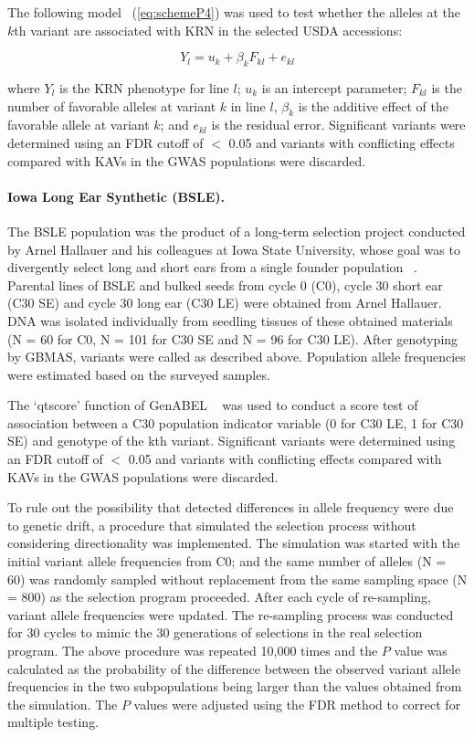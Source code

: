 \documentclass[10pt,letterpaper]{article}
\begin{document}
The following model ~(\ref{eq:schemeP4}) was used to test whether the alleles at the $k$th variant are associated with KRN in the selected USDA accessions:

\begin{equation}\label{eq:schemeP4} 
Y_l = u_k + \beta_k F_{kl} + e_{kl}
\end{equation}

where $Y_l$ is the KRN phenotype for line $l$; $u_k$ is an intercept parameter; $F_{kl}$ is the number of favorable alleles at variant $k$ in line $l$, $\beta_k$ is the additive effect of the favorable allele at variant $k$; and $e_{kl}$ is the residual error. Significant variants were determined using an FDR cutoff of $<$ 0.05 and variants with conflicting effects compared with KAVs in the GWAS populations were discarded.
%
\paragraph{Iowa Long Ear Synthetic (BSLE).}
The BSLE population was the product of a long-term selection project conducted by Arnel Hallauer and his colleagues at Iowa State University, whose goal was to divergently select long and short ears from a single founder population ~\cite{Hallauer2004}. Parental lines of BSLE and bulked seeds from cycle 0 (C0), cycle 30 short ear (C30 SE) and cycle 30 long ear (C30 LE) were obtained from Arnel Hallauer. DNA was isolated individually from seedling tissues of these obtained materials (N = 60 for C0, N = 101 for C30 SE and N = 96 for C30 LE). After genotyping by GBMAS, variants were called as described above. Population allele frequencies were estimated based on the surveyed samples. 

The ‘qtscore’ function of GenABEL ~\cite{Aulchenko2007} was used to conduct a score test of association between a C30 population indicator variable (0 for C30 LE, 1 for C30 SE) and genotype of the kth variant. Significant variants were determined using an FDR cutoff of $<$ 0.05 and variants with conflicting effects compared with KAVs in the GWAS populations were discarded.

To rule out the possibility that detected differences in allele frequency were due to genetic drift, a procedure that simulated the selection process without considering directionality was implemented. The simulation was started with the initial variant allele frequencies from C0; and the same number of alleles (N = 60) was randomly sampled without replacement from the same sampling space (N = 800) as the selection program proceeded. After each cycle of re-sampling, variant allele frequencies were updated. The re-sampling process was conducted for 30 cycles to mimic the 30 generations of selections in the real selection program. The above procedure was repeated 10,000 times and the $P$ value was calculated as the probability of the difference between the observed variant allele frequencies in the two subpopulations being larger than the values obtained from the simulation. The $P$ values were adjusted using the FDR method to correct for multiple testing. 
\end{document}
